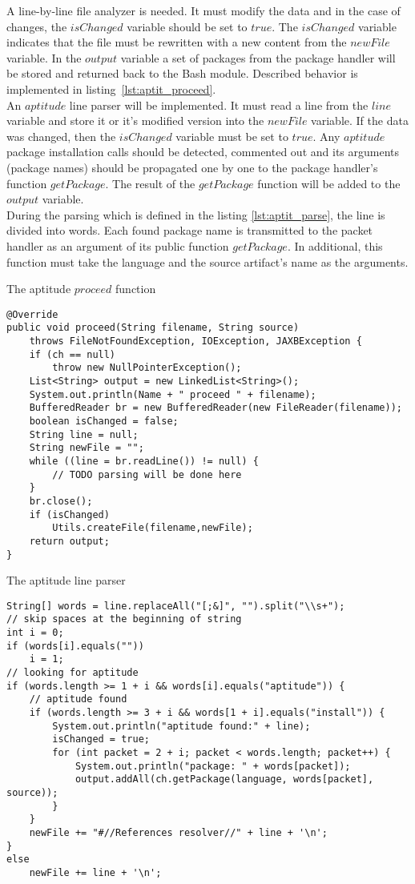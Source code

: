 A line-by-line file analyzer is needed.
It must modify the data and in the case of changes, the $isChanged$ variable should be set to $true$.
The $isChanged$ variable indicates that the file must be rewritten with a new content from the $newFile$ variable.
In the $output$ variable a set of packages from the package handler will be stored and returned back to the Bash module.
Described behavior is implemented in listing~\ref{lst:aptit_proceed}.\\
An $aptitude$ line parser will be implemented.
It must read a line from the $line$ variable and store it or it's modified version into the $newFile$ variable.
If the data was changed, then the $isChanged$ variable must be set to $true$.
Any $aptitude$ package installation calls should be detected, commented out and its arguments (package names) should be propagated one by one to the package handler's function $getPackage$. 
The result of the $getPackage$ function will be added to the $output$ variable.\\
During the parsing which is defined in the listing \ref{lst:aptit_parse}, the line is divided into words. 
Each found package name is transmitted to the packet handler as an argument of its public function $getPackage$.
In additional, this function must take the language and the source artifact's name as the arguments.
\begin{Listing} 
\caption{The aptitude $proceed$ function}
\label{lst:aptit_proceed}
\begin{lstlisting}
@Override
public void proceed(String filename, String source)
	throws FileNotFoundException, IOException, JAXBException {
	if (ch == null)
		throw new NullPointerException();
	List<String> output = new LinkedList<String>();
	System.out.println(Name + " proceed " + filename);
	BufferedReader br = new BufferedReader(new FileReader(filename));
	boolean isChanged = false;
	String line = null;
	String newFile = "";
	while ((line = br.readLine()) != null) {
		// TODO parsing will be done here
	}
	br.close();
	if (isChanged)
		Utils.createFile(filename,newFile);
	return output;
}	 
\end{lstlisting}
\end{Listing} 
\begin{Listing} 
\caption{The aptitude line parser}
\label{lst:aptit_parse}
\begin{lstlisting}
String[] words = line.replaceAll("[;&]", "").split("\\s+");
// skip spaces at the beginning of string
int i = 0;
if (words[i].equals(""))
	i = 1;
// looking for aptitude 
if (words.length >= 1 + i && words[i].equals("aptitude")) {
	// aptitude found
	if (words.length >= 3 + i && words[1 + i].equals("install")) {
		System.out.println("aptitude found:" + line);
		isChanged = true;
		for (int packet = 2 + i; packet < words.length; packet++) {
			System.out.println("package: " + words[packet]);
			output.addAll(ch.getPackage(language, words[packet], source));
		}
	}
	newFile += "#//References resolver//" + line + '\n';
} 
else
	newFile += line + '\n';
\end{lstlisting}
\end{Listing} 
